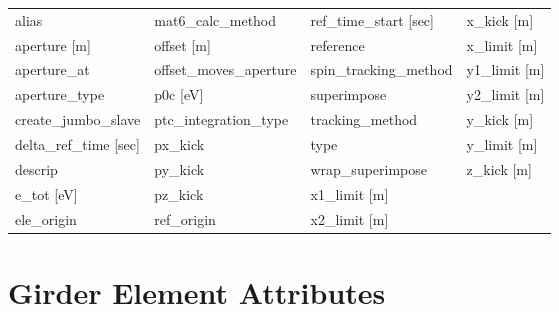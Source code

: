  \begin{tabular}{llll} \toprule
alias                            & mat6_calc_method                 & ref_time_start [sec]             & x_kick [m]                       \\
aperture [m]                     & offset [m]                       & reference                        & x_limit [m]                      \\
aperture_at                      & offset_moves_aperture            & spin_tracking_method             & y1_limit [m]                     \\
aperture_type                    & p0c [eV]                         & superimpose                      & y2_limit [m]                     \\
create_jumbo_slave               & ptc_integration_type             & tracking_method                  & y_kick [m]                       \\
delta_ref_time [sec]             & px_kick                          & type                             & y_limit [m]                      \\
descrip                          & py_kick                          & wrap_superimpose                 & z_kick [m]                       \\
e_tot [eV]                       & pz_kick                          & x1_limit [m]                     &                                  \\
ele_origin                       & ref_origin                       & x2_limit [m]                     &                                  \\
 \bottomrule
 \end{tabular}
 \vfill
 
 \section{Girder Element Attributes}
 \label{s:list.girder}
 
